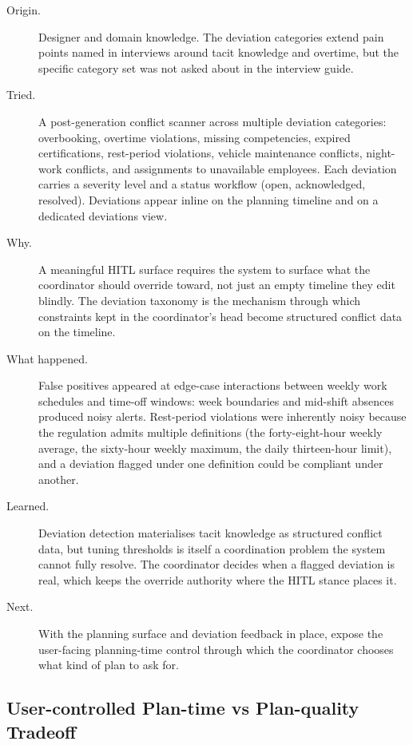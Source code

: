 \begin{description}
  \item[Origin.] Designer and domain knowledge. The deviation categories extend pain points named in interviews around tacit knowledge and overtime, but the specific category set was not asked about in the interview guide.
  \item[Tried.] A post-generation conflict scanner across multiple deviation categories: overbooking, overtime violations, missing competencies, expired certifications, rest-period violations, vehicle maintenance conflicts, night-work conflicts, and assignments to unavailable employees. Each deviation carries a severity level and a status workflow (open, acknowledged, resolved). Deviations appear inline on the planning timeline and on a dedicated deviations view.
  \item[Why.] A meaningful HITL surface requires the system to surface what the coordinator should override toward, not just an empty timeline they edit blindly. The deviation taxonomy is the mechanism through which constraints kept in the coordinator's head become structured conflict data on the timeline.
  \item[What happened.] False positives appeared at edge-case interactions between weekly work schedules and time-off windows: week boundaries and mid-shift absences produced noisy alerts. Rest-period violations were inherently noisy because the regulation admits multiple definitions (the forty-eight-hour weekly average, the sixty-hour weekly maximum, the daily thirteen-hour limit), and a deviation flagged under one definition could be compliant under another.
  \item[Learned.] Deviation detection materialises tacit knowledge as structured conflict data, but tuning thresholds is itself a coordination problem the system cannot fully resolve. The coordinator decides when a flagged deviation is real, which keeps the override authority where the HITL stance places it.
  \item[Next.] With the planning surface and deviation feedback in place, expose the user-facing planning-time control through which the coordinator chooses what kind of plan to ask for.
\end{description}

\subsection{User-controlled Plan-time vs Plan-quality Tradeoff}
\label{sec:iter-tradeoff}

